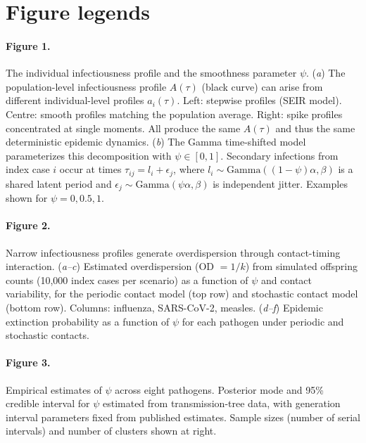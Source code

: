 \documentclass[10pt]{article}
\begin{document}

\clearpage
\section*{Figure legends}

\paragraph{Figure 1.}
The individual infectiousness profile and the smoothness parameter $\psi$.
(\textit{a}) The population-level infectiousness profile $A(\tau)$ (black curve) can arise from different individual-level profiles $a_i(\tau)$. Left: stepwise profiles (SEIR model). Centre: smooth profiles matching the population average. Right: spike profiles concentrated at single moments. All produce the same $A(\tau)$ and thus the same deterministic epidemic dynamics.
(\textit{b}) The Gamma time-shifted model parameterizes this decomposition with $\psi \in [0,1]$. Secondary infections from index case $i$ occur at times $\tau_{ij} = l_i + \epsilon_j$, where $l_i \sim \text{Gamma}((1-\psi)\alpha, \beta)$ is a shared latent period and $\epsilon_j \sim \text{Gamma}(\psi\alpha, \beta)$ is independent jitter. Examples shown for $\psi = 0, 0.5, 1$.
\label{fig:schematic}

\paragraph{Figure 2.}
Narrow infectiousness profiles generate overdispersion through contact-timing interaction.
(\textit{a--c}) Estimated overdispersion (OD $= 1/k$) from simulated offspring counts (10,000 index cases per scenario) as a function of $\psi$ and contact variability, for the periodic contact model (top row) and stochastic contact model (bottom row). Columns: influenza, SARS-CoV-2, measles.
(\textit{d--f}) Epidemic extinction probability as a function of $\psi$ for each pathogen under periodic and stochastic contacts.
\label{fig:overdispersion}

\paragraph{Figure 3.}
Empirical estimates of $\psi$ across eight pathogens. Posterior mode and 95\% credible interval for $\psi$ estimated from transmission-tree data, with generation interval parameters fixed from published estimates. Sample sizes (number of serial intervals) and number of clusters shown at right.
\label{fig:empirical}
\end{document}
